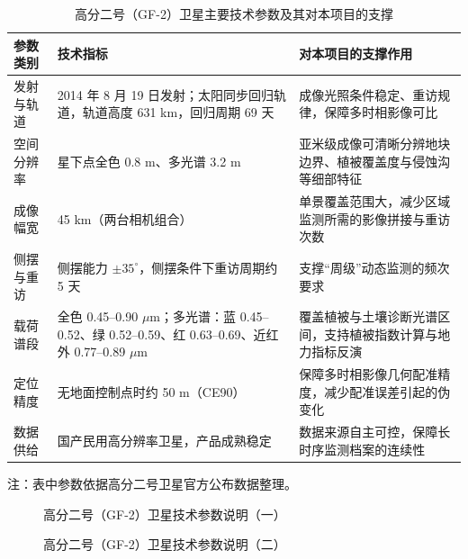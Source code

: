 \documentclass[12pt, a4paper]{ctexart}
\begin{document}
\begin{table}[htbp]
    \centering
    \caption{高分二号（GF-2）卫星主要技术参数及其对本项目的支撑}
    \label{tab:gf2}
    \small
    \begin{tabular}{|p{2.6cm}|p{5.6cm}|p{5.8cm}|}
        \hline
        \textbf{参数类别} & \textbf{技术指标} & \textbf{对本项目的支撑作用} \\
        \hline
        发射与轨道 & 2014 年 8 月 19 日发射；太阳同步回归轨道，轨道高度 631 km，回归周期 69 天 & 成像光照条件稳定、重访规律，保障多时相影像可比 \\
        \hline
        空间分辨率 & 星下点全色 0.8 m、多光谱 3.2 m & 亚米级成像可清晰分辨地块边界、植被覆盖度与侵蚀沟等细部特征 \\
        \hline
        成像幅宽 & 45 km（两台相机组合） & 单景覆盖范围大，减少区域监测所需的影像拼接与重访次数 \\
        \hline
        侧摆与重访 & 侧摆能力 $\pm35^\circ$，侧摆条件下重访周期约 5 天 & 支撑“周级”动态监测的频次要求 \\
        \hline
        载荷谱段 & 全色 0.45--0.90 $\mu$m；多光谱：蓝 0.45--0.52、绿 0.52--0.59、红 0.63--0.69、近红外 0.77--0.89 $\mu$m & 覆盖植被与土壤诊断光谱区间，支持植被指数计算与地力指标反演 \\
        \hline
        定位精度 & 无地面控制点时约 50 m（CE90） & 保障多时相影像几何配准精度，减少配准误差引起的伪变化 \\
        \hline
        数据供给 & 国产民用高分辨率卫星，产品成熟稳定 & 数据来源自主可控，保障长时序监测档案的连续性 \\
        \hline
    \end{tabular}
    \par\vspace{2pt}
    {\footnotesize 注：表中参数依据高分二号卫星官方公布数据整理。}
\end{table}

\begin{figure}[htbp]
    \centering
    \caption{高分二号（GF-2）卫星技术参数说明（一）}
    \label{fig:4a}
\end{figure}

\begin{figure}[htbp]
    \centering
    \caption{高分二号（GF-2）卫星技术参数说明（二）}
    \label{fig:4b}
\end{figure}
\end{document}
